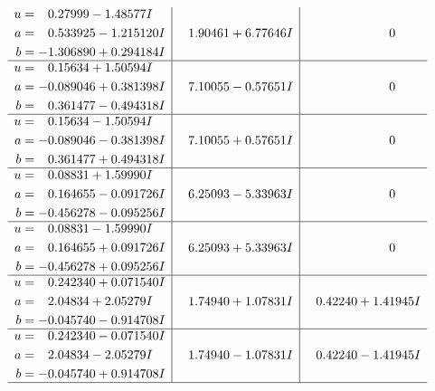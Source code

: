 \documentclass[1p]{elsarticle_modified}
\theoremstyle{definition}
\begin{document}
$$\begin{array}{c|c|c}
\begin{aligned}
u &= \phantom{-}0.27999 - 1.48577 I \\
a &= \phantom{-}0.533925 - 1.215120 I \\
b &= -1.306890 + 0.294184 I\end{aligned}
 & \phantom{-}1.90461 + 6.77646 I & \phantom{-0.000000 } 0 \\ \hline\begin{aligned}
u &= \phantom{-}0.15634 + 1.50594 I \\
a &= -0.089046 + 0.381398 I \\
b &= \phantom{-}0.361477 - 0.494318 I\end{aligned}
 & \phantom{-}7.10055 - 0.57651 I & \phantom{-0.000000 } 0 \\ \hline\begin{aligned}
u &= \phantom{-}0.15634 - 1.50594 I \\
a &= -0.089046 - 0.381398 I \\
b &= \phantom{-}0.361477 + 0.494318 I\end{aligned}
 & \phantom{-}7.10055 + 0.57651 I & \phantom{-0.000000 } 0 \\ \hline\begin{aligned}
u &= \phantom{-}0.08831 + 1.59990 I \\
a &= \phantom{-}0.164655 - 0.091726 I \\
b &= -0.456278 - 0.095256 I\end{aligned}
 & \phantom{-}6.25093 - 5.33963 I & \phantom{-0.000000 } 0 \\ \hline\begin{aligned}
u &= \phantom{-}0.08831 - 1.59990 I \\
a &= \phantom{-}0.164655 + 0.091726 I \\
b &= -0.456278 + 0.095256 I\end{aligned}
 & \phantom{-}6.25093 + 5.33963 I & \phantom{-0.000000 } 0 \\ \hline\begin{aligned}
u &= \phantom{-}0.242340 + 0.071540 I \\
a &= \phantom{-}2.04834 + 2.05279 I \\
b &= -0.045740 - 0.914708 I\end{aligned}
 & \phantom{-}1.74940 + 1.07831 I & \phantom{-}0.42240 + 1.41945 I \\ \hline\begin{aligned}
u &= \phantom{-}0.242340 - 0.071540 I \\
a &= \phantom{-}2.04834 - 2.05279 I \\
b &= -0.045740 + 0.914708 I\end{aligned}
 & \phantom{-}1.74940 - 1.07831 I & \phantom{-}0.42240 - 1.41945 I\\
 \hline 
 \end{array}$$\newpage
\end{document}
